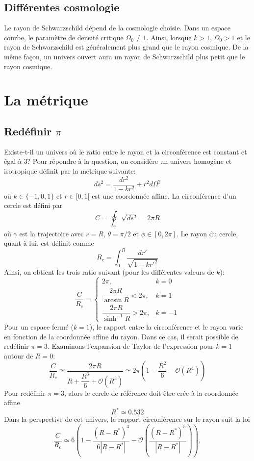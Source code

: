 \documentclass{article}
\numberwithin{equation}{section}
\begin{document}
\subsection{Différentes cosmologie}
Le rayon de Schwarzschild dépend de la cosmologie choisie. Dans un espace courbe, le paramètre de densité 
critique $\Omega_0 \not= 1$. Ainsi, lorsque $k > 1$, $\Omega_0 > 1$ et le rayon de Schwarzschild est généralement 
plus grand que le rayon cosmique. De la même façon, un univers ouvert aura un rayon de Schwarzschild plus 
petit que le rayon cosmique.



\section{La métrique}
\subsection{Redéfinir $\pi$}
Existe-t-il un univers où le ratio entre le rayon et la circonférence est constant et 
égal à 3? Pour répondre à la question, on considère un univers homogène et 
isotropique définit par la métrique suivante: 
\[
        ds^2 = \frac{dr^2}{1 - kr^2} + r^2d\Omega^2
\]
où $k \in \{-1, 0, 1\}$ et $r \in [0,1[$ est une coordonnée affine. 
La circonférence d'un cercle est défini par
\[
        C = \oint_\gamma \sqrt{ds^2} = 2 \pi R
\]
où $\gamma$ est la trajectoire avec $r=R$, $\theta=\pi/2$ et 
$\phi \in [0, 2 \pi]$. Le 
rayon du cercle, quant à lui, est définit comme
\[
        R_c = \int_0^R \frac{dr'}{\sqrt{1 - kr'^2}}
\]
Ainsi, on obtient les trois ratio suivant (pour les différentes valeurs de $k$):
\[
        \frac{C}{R_c} = \left\{ 
\begin{matrix}
        2 \pi, & k = 0 \\[3ex]
        \dfrac{2\pi R}{\arcsin R} < 2 \pi, & k = 1 \\[3ex]
        \dfrac{2 \pi R}{\sinh^{-1} R} > 2 \pi, & k = -1

\end{matrix}
        \right.
\]
Pour un espace fermé ($k=1$), le rapport entre la circonférence et le rayon varie 
en fonction de la coordonnée affine du rayon. Dans ce cas, il serait possible de 
redéfinir $\pi = 3$. Examinons l'expansion de Taylor de l'expression pour $k=1$ autour 
de $R = 0$:
\[
        \frac{C}{R_c} \simeq \frac{2 \pi R}{R + \dfrac{R^3}{6} + \mathcal{O}(R^5)}
        \simeq 2 \pi \left(  1 - \frac{R^2}{6} - \mathcal{O}(R^4)\right)
\]
Pour redéfinir $\pi = 3$, alors le cercle de référence 
doit être crée à la coordonnée affine
\[
        R^* \simeq 0.532
\]
Dans la perspective de cet univers, le rapport circonférence sur le rayon suit la loi
\[
        \frac{C}{R_c} \simeq 6 \left( 1 - \frac{(R - R^*)^3}{6|R - R^{*}|} -
                \mathcal{O}\left(\frac{(R - R^{*})^{5}}{|R - R^{*}|}\right) \right),
\]
\end{document}

